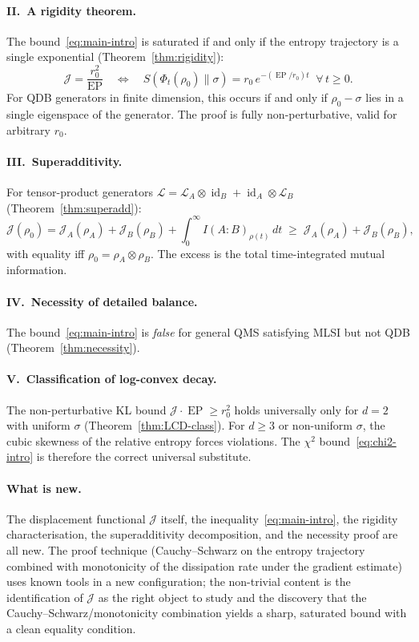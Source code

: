 \documentclass[11pt,a4paper]{article}
\theoremstyle{definition}
\theoremstyle{remark}
\DeclareMathOperator{\id}{id}
\DeclareMathOperator{\EP}{EP}
\newcommand{\LL}{\mathcal{L}}
\begin{document}
\paragraph{II.\ A rigidity theorem.}
The bound~\eqref{eq:main-intro} is saturated if and only if the
entropy trajectory is a single exponential
(Theorem~\ref{thm:rigidity}):
\begin{equation}
  \mathcal{J} = \frac{r_0^2}{\EP} \quad\Longleftrightarrow\quad
  S(\Phi_t(\rho_0)\|\sigma) = r_0\, e^{-(\EP/r_0)t}
  \;\;\forall\, t \ge 0.
\end{equation}
For QDB generators in finite dimension, this occurs if and only if
$\rho_0 - \sigma$ lies in a single eigenspace of the generator.
The proof is fully non-perturbative, valid for arbitrary $r_0$.

\paragraph{III.\ Superadditivity.}
For tensor-product generators
$\LL = \LL_A \otimes \id_B + \id_A \otimes \LL_B$
(Theorem~\ref{thm:superadd}):
\[
  \mathcal{J}(\rho_0) = \mathcal{J}_A(\rho_A) + \mathcal{J}_B(\rho_B)
  + \int_0^\infty I(A\!:\!B)_{\rho(t)}\,dt \;\ge\;
  \mathcal{J}_A(\rho_A) + \mathcal{J}_B(\rho_B),
\]
with equality iff $\rho_0 = \rho_A \otimes \rho_B$.  The excess is
the total time-integrated mutual information.

\paragraph{IV.\ Necessity of detailed balance.}
The bound~\eqref{eq:main-intro} is \emph{false} for general QMS
satisfying MLSI but not QDB (Theorem~\ref{thm:necessity}).

\paragraph{V.\ Classification of log-convex decay.}
The non-perturbative KL bound $\mathcal{J}\cdot\EP \ge r_0^2$
holds universally only for $d = 2$ with uniform $\sigma$
(Theorem~\ref{thm:LCD-class}).  For $d \ge 3$ or non-uniform
$\sigma$, the cubic skewness of the relative entropy forces
violations.  The $\chi^2$ bound~\eqref{eq:chi2-intro} is
therefore the correct universal substitute.

\paragraph{What is new.}
The displacement functional $\mathcal{J}$ itself, the
inequality~\eqref{eq:main-intro}, the rigidity
characterisation, the superadditivity decomposition, and the
necessity proof are all new.  The proof
technique (Cauchy--Schwarz on the entropy trajectory combined with
monotonicity of the dissipation rate under the gradient estimate)
uses known tools in a new configuration;
the non-trivial content is the identification of $\mathcal{J}$ as
the right object to study and the discovery that the
Cauchy--Schwarz/monotonicity combination yields a sharp, saturated
bound with a clean equality condition.
\end{document}

